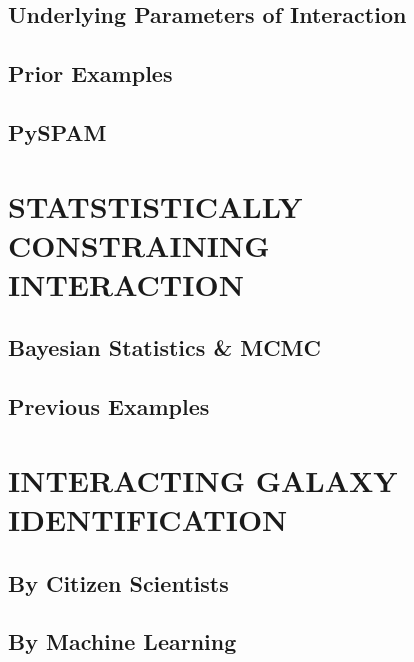 \subsection{Underlying Parameters of Interaction}

\subsection{Prior Examples}

\subsection{PySPAM}

\section{STATSTISTICALLY CONSTRAINING INTERACTION}

\subsection{Bayesian Statistics \& MCMC}

\subsection{Previous Examples}

\section{INTERACTING GALAXY IDENTIFICATION}

\subsection{By Citizen Scientists}

\subsection{By Machine Learning}


